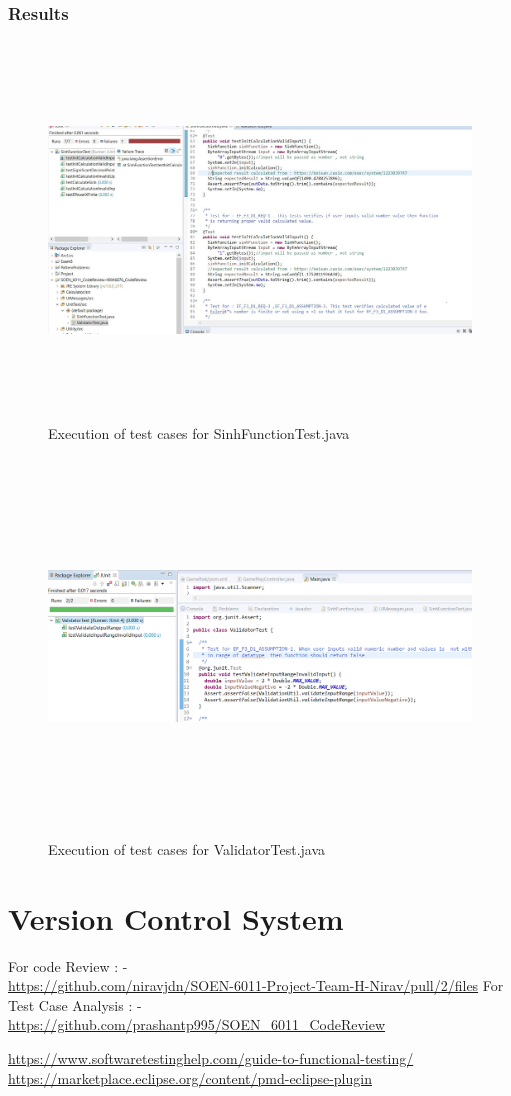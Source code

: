 \documentclass[a4paper,11pt]{report}
\begin{document}
\subsubsection{Results}
\begin{figure}[h!]
    \includegraphics[width=16cm, height=10cm]{Image/testcasesinh.JPG}
    \caption{Execution of test cases for SinhFunctionTest.java}
\end{figure}
\begin{figure}[h!]
    \includegraphics[width=16cm, height=10cm]{Image/testReview2.png}
    \caption{Execution of test cases for ValidatorTest.java}
\end{figure}
\clearpage
\newpage
\section{Version Control System}
For code Review : -\\
\url{https://github.com/niravjdn/SOEN-6011-Project-Team-H-Nirav/pull/2/files}
For Test Case Analysis : - \\
\url{https://github.com/prashantp995/SOEN_6011_CodeReview}

\begin{thebibliography}{9}
\url{https://www.softwaretestinghelp.com/guide-to-functional-testing/}
\url{https://marketplace.eclipse.org/content/pmd-eclipse-plugin}
\end{thebibliography}
\end{document}
